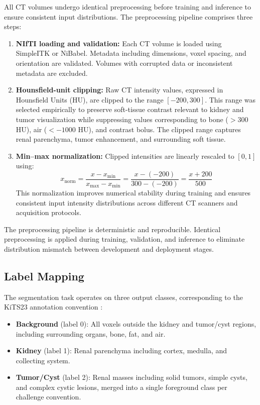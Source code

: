 All CT volumes undergo identical preprocessing before training and inference to ensure consistent input distributions. The preprocessing pipeline comprises three steps:

\begin{enumerate}
    \item \textbf{NIfTI loading and validation:} Each CT volume is loaded using SimpleITK or NiBabel. Metadata including dimensions, voxel spacing, and orientation are validated. Volumes with corrupted data or inconsistent metadata are excluded.
    
    \item \textbf{Hounsfield-unit clipping:} Raw CT intensity values, expressed in Hounsfield Units (HU), are clipped to the range $[-200, 300]$. This range was selected empirically to preserve soft-tissue contrast relevant to kidney and tumor visualization while suppressing values corresponding to bone ($> 300$ HU), air ($< -1000$ HU), and contrast bolus. The clipped range captures renal parenchyma, tumor enhancement, and surrounding soft tissue.
    
    \item \textbf{Min--max normalization:} Clipped intensities are linearly rescaled to $[0, 1]$ using:
    \begin{equation}
    x_{\text{norm}} = \frac{x - x_{\text{min}}}{x_{\text{max}} - x_{\text{min}}} = \frac{x - (-200)}{300 - (-200)} = \frac{x + 200}{500}
    \end{equation}
    This normalization improves numerical stability during training and ensures consistent input intensity distributions across different CT scanners and acquisition protocols.
\end{enumerate}

The preprocessing pipeline is deterministic and reproducible. Identical preprocessing is applied during training, validation, and inference to eliminate distribution mismatch between development and deployment stages.

\subsection{Label Mapping}

The segmentation task operates on three output classes, corresponding to the KiTS23 annotation convention \cite{kits23}:

\begin{itemize}
    \item \textbf{Background} (label 0): All voxels outside the kidney and tumor/cyst regions, including surrounding organs, bone, fat, and air.
    \item \textbf{Kidney} (label 1): Renal parenchyma including cortex, medulla, and collecting system.
    \item \textbf{Tumor/Cyst} (label 2): Renal masses including solid tumors, simple cysts, and complex cystic lesions, merged into a single foreground class per challenge convention.
\end{itemize}

